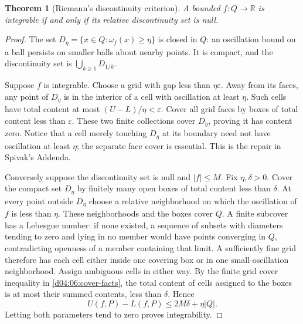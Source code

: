 \documentclass[11pt,oneside,openany]{book}
\newtheorem{theorem}{Theorem}[chapter]
\theoremstyle{definition}
\theoremstyle{remark}
\newcommand{\R}{\mathbb R}
\newcommand{\eps}{\varepsilon}
\begin{document}
\begin{theorem}[Riemann's discontinuity criterion]\label{d04:06:riemann-criterion}
A bounded $f:Q\to\R$ is integrable if and only if its relative discontinuity set is null.
\end{theorem}
\begin{proof}
The set $D_\eta=\{x\in Q:\omega_f(x)\geq\eta\}$ is closed in $Q$: an oscillation bound on a ball persists on smaller balls about nearby points. It is compact, and the discontinuity set is $\bigcup_{k\geq1}D_{1/k}$.

Suppose $f$ is integrable. Choose a grid with gap less than $\eta\eps$. Away from its faces, any point of $D_\eta$ is in the interior of a cell with oscillation at least $\eta$. Such cells have total content at most $(U-L)/\eta<\eps$. Cover all grid faces by boxes of total content less than $\eps$. These two finite collections cover $D_\eta$, proving it has content zero. Notice that a cell merely touching $D_\eta$ at its boundary need not have oscillation at least $\eta$; the separate face cover is essential. This is the repair in Spivak's Addenda.

Conversely suppose the discontinuity set is null and $|f|\leq M$. Fix $\eta,\delta>0$. Cover the compact set $D_\eta$ by finitely many open boxes of total content less than $\delta$. At every point outside $D_\eta$ choose a relative neighborhood on which the oscillation of $f$ is less than $\eta$. These neighborhoods and the boxes cover $Q$. A finite subcover has a Lebesgue number: if none existed, a sequence of subsets with diameters tending to zero and lying in no member would have points converging in $Q$, contradicting openness of a member containing that limit. A sufficiently fine grid therefore has each cell either inside one covering box or in one small-oscillation neighborhood. Assign ambiguous cells in either way. By the finite grid cover inequality in \cref{d04:06:cover-facts}, the total content of cells assigned to the boxes is at most their summed contents, less than $\delta$. Hence
\[
 U(f,P)-L(f,P)\leq 2M\delta+\eta|Q|.
\]
Letting both parameters tend to zero proves integrability.
\end{proof}
\end{document}

